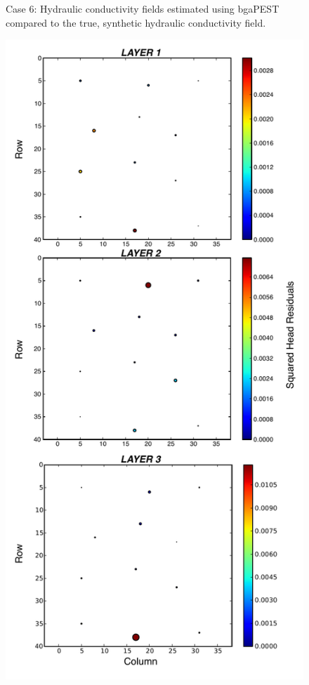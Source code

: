 \documentclass[11pt,oneside,onecolumn]{usgsreport}
\begin{document}
\begin{appendix}
\begin{figure}[!t]
\caption{\label{fig:3LK_case6}Case 6: Hydraulic conductivity fields estimated
using bgaPEST compared to the true, synthetic hydraulic conductivity
field.}
\end{figure}


\begin{figure}[!t]
\begin{center}\includegraphics[scale=0.5]{figures/3L_resid_case6}\end{center}


\end{figure}
\end{appendix}
\end{document}
